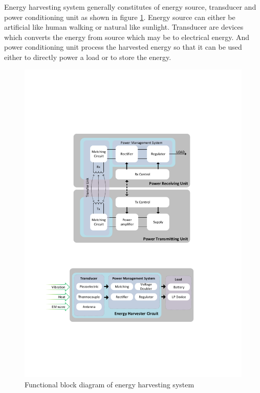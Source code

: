 \documentclass[12pt,a4paper,UKenglish]{article}
\begin{document}
Energy harvesting system generally constitutes of energy source, transducer and power conditioning unit as shown 
in figure \ref{fig:visio_harvest_func}. Energy 
source can either be artificial like human walking or natural like sunlight. Transducer are devices which 
converts the energy from source which may be to electrical energy. And power conditioning unit process the 
harvested energy so that it can be used either to directly power a load or to store the energy. \\

\begin{figure}[!htbp] %
   \centering
   \includegraphics[width=\textwidth]{img/visio_harvest_func.pdf}
   \caption{Functional block diagram of energy harvesting system}
   \label{fig:visio_harvest_func}
\end{figure}
\end{document}

